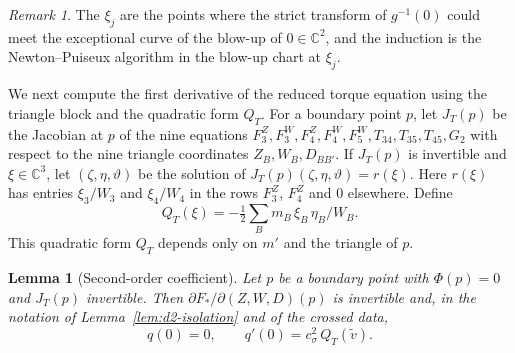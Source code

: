 \documentclass[Threeside,11pt]{article}
\newtheorem{lemma}[theorem]{Lemma}
\theoremstyle{definition}
\theoremstyle{remark}
\newtheorem{remark}[theorem]{Remark}
\numberwithin{equation}{section}
\newcommand{\C}{\mathbb C}\newcommand{\T}{\mathbb T}
\theoremstyle{remark}
\begin{document}
\begin{remark}\label{rem:d2-corank-two}
The $\xi_j$ are the points where the strict transform of $g^{-1}(0)$ could meet the exceptional
curve of the blow-up of $0\in\C^2$, and the induction is the Newton--Puiseux algorithm in the
blow-up chart at $\xi_j$.
\end{remark}

{We next compute the first derivative of the reduced torque equation
using the triangle block and the quadratic form $Q_T$.
For a boundary point $p$, let $J_T(p)$ be the
Jacobian at $p$ of the nine equations
$F^Z_3,F^W_3,F^Z_4,F^W_4,F^W_5,T_{34},T_{35},T_{45},G_2$ with respect to the nine triangle
coordinates $Z_B,W_B,D_{BB'}$.  If $J_T(p)$ is invertible and $\xi\in\C^3$, let
$(\zeta,\eta,\vartheta)$ be the solution of $J_T(p)(\zeta,\eta,\vartheta)=r(\xi)$.
Here $r(\xi)$ has entries $\xi_3/W_3$ and $\xi_4/W_4$ in the rows $F^Z_3$, $F^Z_4$ and $0$
elsewhere.  Define}
\[
  Q_T(\xi)=-\tfrac12\textstyle\sum_Bm_B\,\xi_B\,\eta_B/W_B .
\]
{This quadratic form $Q_T$ depends only on $m'$ and the triangle of $p$.}

\begin{lemma}[Second-order coefficient]\label{lem:d2-second}
Let $p$ be a boundary point with $\Phi(p)=0$ and $J_T(p)$ invertible.  Then
$\partial F_*/\partial(Z,W,D)(p)$ is invertible and, in the notation of
Lemma~\ref{lem:d2-isolation} and of the crossed data,
\[
  q(0)=0,\qquad q'(0)=c_\sigma^2\,Q_T(\tilde v).
\]
\end{lemma}
\end{document}
